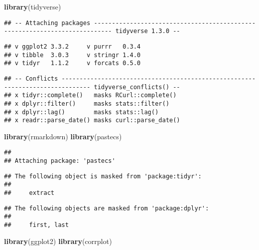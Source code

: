 \documentclass[
]{article}
\newenvironment{Shaded}{\begin{snugshade}}{\end{snugshade}}
\newcommand{\KeywordTok}[1]{\textcolor[rgb]{0.13,0.29,0.53}{\textbf{#1}}}
\newcommand{\NormalTok}[1]{#1}
\begin{document}
\begin{Shaded}
\begin{Highlighting}[]
\KeywordTok{library}\NormalTok{(tidyverse)}
\end{Highlighting}
\end{Shaded}

\begin{verbatim}
## -- Attaching packages --------------------------------------------------------------------------- tidyverse 1.3.0 --
\end{verbatim}

\begin{verbatim}
## v ggplot2 3.3.2     v purrr   0.3.4
## v tibble  3.0.3     v stringr 1.4.0
## v tidyr   1.1.2     v forcats 0.5.0
\end{verbatim}

\begin{verbatim}
## -- Conflicts ------------------------------------------------------------------------------ tidyverse_conflicts() --
## x tidyr::complete()   masks RCurl::complete()
## x dplyr::filter()     masks stats::filter()
## x dplyr::lag()        masks stats::lag()
## x readr::parse_date() masks curl::parse_date()
\end{verbatim}

\begin{Shaded}
\begin{Highlighting}[]
\KeywordTok{library}\NormalTok{(rmarkdown)}
\KeywordTok{library}\NormalTok{(pastecs)}
\end{Highlighting}
\end{Shaded}

\begin{verbatim}
## 
## Attaching package: 'pastecs'
\end{verbatim}

\begin{verbatim}
## The following object is masked from 'package:tidyr':
## 
##     extract
\end{verbatim}

\begin{verbatim}
## The following objects are masked from 'package:dplyr':
## 
##     first, last
\end{verbatim}

\begin{Shaded}
\begin{Highlighting}[]
\KeywordTok{library}\NormalTok{(ggplot2)}
\KeywordTok{library}\NormalTok{(corrplot)}
\end{Highlighting}
\end{Shaded}
\end{document}
